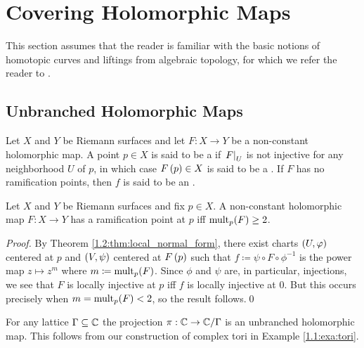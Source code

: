 \documentclass[../Moduli_Spaces_of_Riemann_Surfaces.tex]{subfiles}
\begin{document}
    \section{Covering Holomorphic Maps}
    This section assumes that the reader is familiar with the basic notions of homotopic curves and liftings from algebraic topology, for which we refer the reader to \cite[][Sections 4.7]{otto}.
    \subsection{Unbranched Holomorphic Maps}
    \begin{definition}
        Let $X$ and $Y$ be Riemann surfaces and let $F:X\to Y$ be a non-constant holomorphic map. A point $p\in X$ is said to be a  if $\left.F\right|_U$ is not injective for any neighborhood $U$ of $p$, in which case $F\left(p\right)\in X$ is said to be a . If $F$ has no ramification points, then $f$ is said to be an .
    \end{definition}
    \begin{proposition}
        Let $X$ and $Y$ be Riemann surfaces and fix $p\in X$. A non-constant holomorphic map $F:X\to Y$ has a ramification point at $p$ iff $\operatorname{mult}_p\!\left(F\right)\geq2$.
    \end{proposition}
    \begin{proof}
        By Theorem \ref{1.2:thm:local_normal_form}, there exist charts $\left(U,\varphi\right)$ centered at $p$ and $\left(V,\psi\right)$ centered at $F\left(p\right)$ such that $f\coloneqq\psi\circ F\circ\phi^{-1}$ is the power map $z\mapsto z^m$ where $m\coloneqq\operatorname{mult}_p\!\left(F\right)$. Since $\phi$ and $\psi$ are, in particular, injections, we see that $F$ is locally injective at $p$ iff $f$ is locally injective at $0$. But this occurs precisely when $m=\operatorname{mult}_p\!\left(F\right)<2$, so the result follows.\qed
    \end{proof}
    \begin{example}
        For any lattice $\Gamma\subseteq\mathbb{C}$ the projection $\pi:\mathbb{C}\to\mathbb{C}/\Gamma$ is an unbranched holomorphic map. This follows from our construction of complex tori in Example \ref{1.1:exa:tori}.\exqed
    \end{example}
\end{document}
